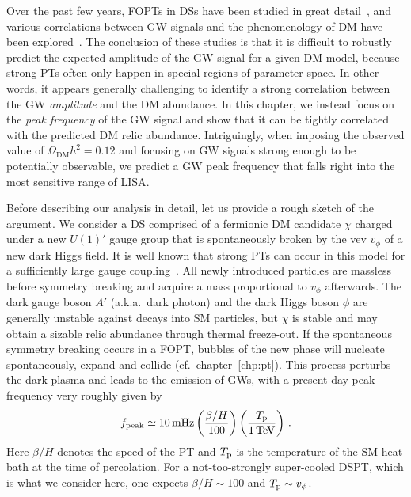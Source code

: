 Over the past few years,  \acp{FOPT} in \acp{DS} have been studied in great detail~\cite{Espinosa:2008kw, Schwaller:2015tja, Breitbach:2018ddu, Ertas:2021xeh, Bringmann:2023opz}, and various correlations between \ac{GW} signals and the phenomenology of \ac{DM} have been explored~\cite{Alanne:2014bra, Baldes:2017rcu, Hall:2019rld, Baker:2019ndr, Azatov:2021ifm, Baker:2021nyl, Kierkla:2022odc, Lewicki:2023mik, Lewicki:2023ioy, Kanemura:2023jiw, Biondini:2022ggt, Arcadi:2023lwc,Madge:2018gfl}. The conclusion of these studies is that it is difficult to robustly predict the expected amplitude of the \ac{GW} signal for a given \ac{DM} model, because strong \acp{PT} often only happen in special  regions of parameter space. In other words, it appears generally challenging to identify a strong correlation between the \ac{GW} \textit{amplitude} and the \ac{DM} abundance. In this chapter, we instead focus on the \textit{peak frequency} of the \ac{GW} signal and show that it can be tightly correlated with the predicted \ac{DM} relic abundance. Intriguingly, when imposing the observed value of $\Omega_\text{DM} h^2 = 0.12$ and focusing on \ac{GW} signals strong enough to be potentially observable, we predict a \ac{GW} peak frequency that falls right into the most sensitive range of \ac{LISA}.

Before describing our analysis in detail, let us provide a rough sketch of the argument. We consider a \ac{DS} comprised of a fermionic \ac{DM} candidate $\chi$ charged under a new $U(1)'$ gauge group that is spontaneously broken by the \ac{vev} $v_\phi$ of a new dark Higgs field. It is well known that strong \acp{PT} can occur in this model for a sufficiently large gauge coupling~\cite{Croon:2018kqn,Athron:2023aqe}. All newly introduced particles are massless before symmetry breaking and acquire a mass proportional to $v_\phi$ afterwards. The dark gauge boson $A'$ (a.k.a.~dark photon) and the dark Higgs boson $\phi$ are generally unstable against decays into \ac{SM} particles, but $\chi$ is stable and may obtain a sizable relic  abundance through thermal freeze-out. If the spontaneous symmetry breaking occurs in a \ac{FOPT}, bubbles of the new phase will nucleate spontaneously, expand and collide (cf.~chapter~\ref{chp:pt}). This process perturbs the dark plasma and leads to the emission of \acp{GW}, with a present-day peak frequency very roughly given by~\cite{Caprini:2019egz}
\begin{align}
	\label{eq:fpeak_simp}
	f_\mathrm{peak} \simeq 10 \, \text{mHz} \left( \frac{\beta/H}{100} \right) \left( \frac{T_{\text{p}}}{1 \, \text{TeV}} \right) \, .
\end{align}
Here $\beta/H$ denotes the speed of the \ac{PT} and $T_{\text{p}}$ is the temperature of the \ac{SM} heat bath at the time of percolation. For a not-too-strongly super-cooled \ac{DSPT}, which is what we consider here, one expects $\beta / H \sim 100$ and $T_{\text{p}} \sim v_\phi$.

